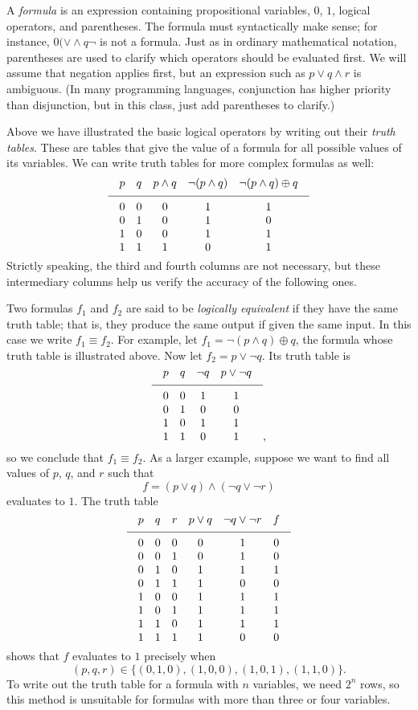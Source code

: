 A {\it formula} is an expression containing propositional variables, $0$, $1$, logical operators, and
parentheses. The formula must syntactically make sense; for instance, $0 (\vee \wedge q \neg $ is
not a formula. Just as in ordinary mathematical notation,
parentheses are used to clarify which operators should be evaluated first. We will assume that negation
applies first, but an expression such as $p\vee q \wedge r$ is ambiguous. (In many programming languages,
conjunction has higher priority than disjunction, but in this class, just add parentheses to clarify.)

Above we have illustrated the basic logical operators
by writing out their {\it truth tables}. These are tables that give the value of
a formula for all possible values of its variables. We can write truth tables for more complex formulas as
well:
$$
\vbox{
\tabskip=1em plus.2em minus .2em
\halign{
\hfil$#$\hfil & \hfil$#$\hfil & \hfil$#$\hfil & \hfil$#$\hfil & \hfil$#$\hfil \cr
p & q & p\wedge q & \neg(p \wedge q) & \neg(p\wedge q) \oplus q \cr
\noalign{\medskip}
\noalign{\hrule}
\noalign{\medskip}
0 & 0 & 0 & 1 & 1 \cr
0 & 1 & 0 & 1 & 0 \cr
1 & 0 & 0 & 1 & 1 \cr
1 & 1 & 1 & 0 & 1 \cr
}}
$$
Strictly speaking, the third and fourth columns are not necessary, but these intermediary columns help us
verify the accuracy of the following ones.

Two formulas $f_1$ and $f_2$ are said to be {\it logically equivalent} if they have the same truth table;
that is, they produce the same output if given the same input. In this case we write $f_1 \equiv f_2$.
For example, let $f_1 = \neg(p\wedge q) \oplus q$, the formula whose truth table is illustrated above.
Now let $f_2 = p \vee \neg q$. Its truth table is
$$
\vbox{
\tabskip=1em plus.2em minus .2em
\halign{
\hfil$#$\hfil & \hfil$#$\hfil & \hfil$#$\hfil & \hfil$#$\hfil \cr
p & q & \neg q & p\vee \neg q \cr
\noalign{\medskip}
\noalign{\hrule}
\noalign{\medskip}
0 & 0 & 1 & 1 \cr
0 & 1 & 0 & 0 \cr
1 & 0 & 1 & 1 \cr
1 & 1 & 0 & 1 \cr
}},
$$
so we conclude that $f_1 \equiv f_2$. As a larger example, suppose we want to find all
values of $p$, $q$, and $r$ such that
$$ f = (p\vee q)\wedge (\neg q \vee \neg r)$$
evaluates to $1$. The truth table
$$
\vbox{
\tabskip=1em plus.2em minus .2em
\halign{
\hfil$#$\hfil & \hfil$#$\hfil & \hfil$#$\hfil & \hfil$#$\hfil &
\hfil$#$\hfil & \hfil$#$\hfil  \cr
p & q & r & p\vee q & \neg q \vee \neg r & f \cr
\noalign{\medskip}
\noalign{\hrule}
\noalign{\medskip}
0 & 0 & 0 & 0 & 1 & 0 \cr
0 & 0 & 1 & 0 & 1 & 0 \cr
0 & 1 & 0 & 1 & 1 & 1 \cr
0 & 1 & 1 & 1 & 0 & 0 \cr
1 & 0 & 0 & 1 & 1 & 1 \cr
1 & 0 & 1 & 1 & 1 & 1 \cr
1 & 1 & 0 & 1 & 1 & 1 \cr
1 & 1 & 1 & 1 & 0 & 0 \cr
}}
$$
shows that $f$ evaluates to $1$ precisely when
$$(p,q,r) \in \bigl\{(0,1,0), (1,0,0), (1,0,1), (1,1,0)\bigr\}.$$
To write out the truth table for a formula with $n$ variables, we need $2^n$ rows, so this
method is unsuitable for formulas with more than three or four variables.

